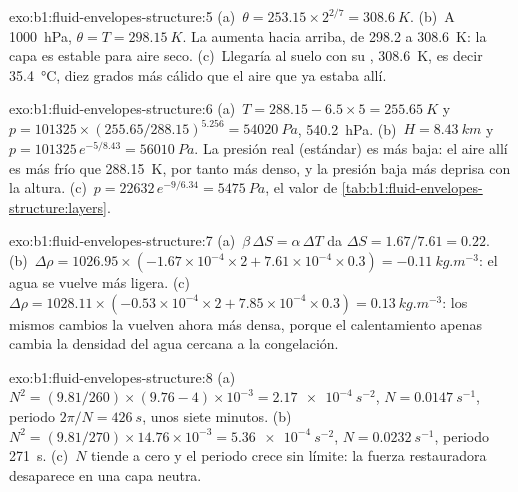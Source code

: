 \begin{solution}{exo:b1:fluid-envelopes-structure:5}
(a)~$\theta = 253.15 \times 2^{2/7} = \qty{308.6}{K}$. (b)~A \qty{1000}{hPa},
$\theta = T = \qty{298.15}{K}$. La  aumenta hacia arriba, de 298.2 a \qty{308.6}{K}: la capa es estable para aire seco. (c)~Llegaría al suelo con su , \qty{308.6}{K}, es decir \qty{35.4}{\celsius}, diez grados más cálido que el aire que ya estaba allí.
\end{solution}

\begin{solution}{exo:b1:fluid-envelopes-structure:6}
(a)~$T = 288.15 - 6.5 \times 5 = \qty{255.65}{K}$ y $p = \num{101325} \times
(255.65/288.15)^{5.256} = \qty{54020}{Pa}$, \qty{540.2}{hPa}. (b)~$H =
\qty{8.43}{km}$ y $p = \num{101325}\,e^{-5/8.43} = \qty{56010}{Pa}$. La presión real (estándar) es más baja: el aire allí es más frío que \qty{288.15}{K}, por tanto más denso, y la presión baja más deprisa con la altura. (c)~$p = \num{22632}\,
e^{-9/6.34} = \qty{5475}{Pa}$, el valor de
\cref{tab:b1:fluid-envelopes-structure:layers}.
\end{solution}

\begin{solution}{exo:b1:fluid-envelopes-structure:7}
(a)~$\beta\,\Delta S = \alpha\,\Delta T$ da $\Delta S = 1.67/7.61 = 0.22$.
(b)~$\Delta\rho = 1026.95 \times (-1.67\times10^{-4} \times 2 + 7.61\times10^{-4}
\times 0.3) = \qty{-0.11}{kg.m^{-3}}$: el agua se vuelve más ligera.
(c)~$\Delta\rho = 1028.11 \times (-0.53\times10^{-4} \times 2 + 7.85\times10^{-4}
\times 0.3) = \qty{+0.13}{kg.m^{-3}}$: los mismos cambios la vuelven ahora más densa, porque
el calentamiento apenas cambia la densidad del agua cercana a la congelación.
\end{solution}

\begin{solution}{exo:b1:fluid-envelopes-structure:8}
(a)~$N^2 = (9.81/260) \times (9.76 - 4)\times10^{-3} = \qty{2.17e-4}{s^{-2}}$,
$N = \qty{0.0147}{s^{-1}}$, periodo $2\pi/N = \qty{426}{s}$, unos siete
minutos. (b)~$N^2 = (9.81/270) \times 14.76\times10^{-3} = \qty{5.36e-4}{s^{-2}}$,
$N = \qty{0.0232}{s^{-1}}$, periodo \qty{271}{s}. (c)~$N$ tiende a cero y el periodo crece sin límite: la fuerza restauradora desaparece en una capa neutra.
\end{solution}

